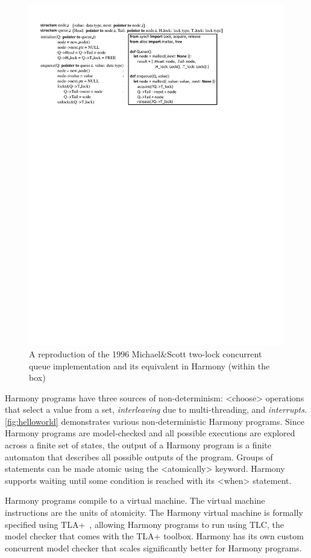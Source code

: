 \documentclass[twocolumn]{article}
\begin{document}
\begin{figure}
\begin{center}
\includegraphics[width=.9\textwidth]{MS.pdf}
\end{center}
\caption{A reproduction of the 1996 Michael\&Scott two-lock concurrent queue
implementation and its equivalent in Harmony (within the box)}
\label{fig:ms}
\end{figure}

Harmony programs have three sources of non-determinism:
<{choose}> operations that select a value from a set,
\emph{interleaving} due to multi-threading, and \emph{interrupts}.
\autoref{fig:helloworld} demonstrates various non-deterministic
Harmony programs.
Since Harmony programs are model-checked and all possible
executions are explored across a finite set of states, the output of a
Harmony program is a finite automaton that describes all possible
outputs of the program.  Groups of statements can be made atomic
using the <{atomically}> keyword.  Harmony supports
waiting until some condition is reached with its <{when}> statement.

Harmony programs compile to a virtual machine.  The virtual machine
instructions are the units of atomicity.  The Harmony virtual
machine is formally specified using TLA+~\cite{Lamport02}, allowing
Harmony programs to run using TLC, the model checker that comes
with the TLA+ toolbox.  Harmony has its own custom concurrent model
checker that scales significantly better for Harmony programs.
\end{document}
